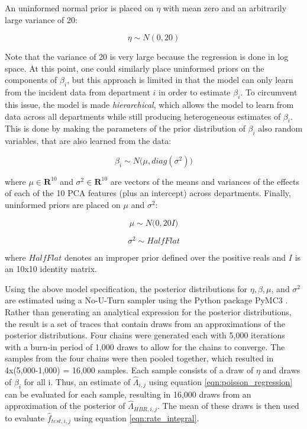\documentclass{svjour3}
\begin{document}
\noindent An uninformed normal prior is placed on $\eta$ with mean zero and an arbitrarily large variance of 20:

 \begin{equation}
  \label{eqn:eta_prior}
  \eta \sim N(0,20)
\end{equation}

\noindent Note that the variance of 20 is very large because the regression is done in log space. At this point, one could similarly place uninformed priors on the components of $\beta_i$, but this approach is limited in that the model can only learn from the incident data from department $i$ in order to estimate $\beta_i$. To circumvent this issue, the model is made \textit{hierarchical}, which allows the model to learn from data across all departments while still producing heterogeneous estimates of $\beta_i$. This is done by making the parameters of the prior distribution of $\beta_i$ also random variables, that are also learned from the data:

 \begin{equation}
  \label{eqn:beta_prior}
  \beta_i \sim N\big(\mu,diag(\sigma^2)\big)
\end{equation}

\noindent where $\mu \in \textbf{R}^{10}$ and $\sigma^2 \in \textbf{R}^{10}$ are vectors of the means and variances of the effects of each of the 10 PCA features (plus an intercept) across departments. Finally, uninformed priors are placed on $\mu$ and $\sigma^2$:

 \begin{equation}
  \label{eqn:mu_prior}
  \mu \sim N\big(0,20I\big)
\end{equation}

 \begin{equation}
  \label{eqn:sigma2_prior}
  \sigma^2 \sim HalfFlat
\end{equation}

\noindent where $HalfFlat$ denotes an improper prior defined over the positive reals and $I$ is an 10x10 identity matrix.

Using the above model specification, the posterior distributions for $\eta, \beta, \mu$, and $\sigma^2$ are estimated using a No-U-Turn sampler \cite{hoffman2014no} using the Python package PyMC3 \cite{salvatier2016probabilistic}. Rather than generating an analytical expression for the posterior distributions, the result is a set of traces that contain draws from an approximations of the posterior distributions. Four chains were generated each with 5,000 iterations with a burn-in period of 1,000 draws to allow for the chains to converge. The samples from the four chains were then pooled together, which resulted in 4x(5,000-1,000) = 16,000 samples. Each sample consists of a draw of $\eta$ and draws of $\beta_i$ for all i. Thus, an estimate of $\hat\Lambda_{i,j}$ using equation \ref{eqn:poisson_regression} can be evaluated for each sample, resulting in 16,000 draws from an approximation of the posterior of $\hat\Lambda_{HBR,i,j}$. The mean of these draws is then used to evaluate $\hat{f}_{test,i,j}$ using equation \ref{eqn:rate_integral}.
\end{document}
